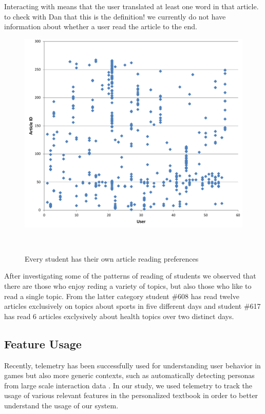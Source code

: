 \begin{added}

  Interacting with means that the user translated at least one word in that article. to check with Dan that this is the definition! we currently do not have information about whether a user read the article to the end. 

\end{added}

\begin{figure}[h!]
\centering
  \includegraphics[width=0.9\columnwidth]{figures/users_articles}
  \caption{Every student has their own article reading preferences}~\label{fig:articles_read}
\end{figure}

\begin{added}

  After investigating some of the patterns of reading of students we observed that there are those who enjoy reding a variety of topics, but also those who like to read a single topic. 
  From the latter category student \#608 has read twelve articles exclusively on topics about sports in five different days and student \#617 has read 6 articles exclysively about health topics over two distinct days.
  
\end{added}

\subsection{Feature Usage}
\newcommand{\feature}[1]{{\em #1}}
Recently, telemetry has been successfully used for understanding user behavior in games \cite{Gagne11-telemetry} but also more generic contexts, such as automatically detecting personas from large scale interaction data \cite{Zhang16-telemetry}. In our study, we used telemetry to track the usage of various relevant features in the personalized textbook in order to better understand the usage of our system.

